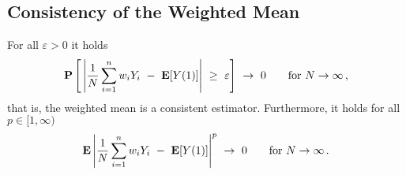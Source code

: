 \subsection*{Consistency of the Weighted Mean}
\begin{theorem}
  \label{bw:ce:th}
  For all
  $\varepsilon>0$ it holds
  \begin{gather*}
    \P
    \left[ 
      \,
  \left| 
    \frac{1}{N}
    \sum_{i=1}^{n} 
    w_i
    Y_i
    \ 
    -
    \ 
    \E[Y(1)]
  \right|
    \ 
    \ge
    \ 
    \varepsilon
    \right]
    \ 
    \to
    \ 
    0
    \qquad
    \text{for}\ 
    N
    \to 
    \infty
    \,,
  \end{gather*}
  that is, the weighted mean is a consistent estimator.
  Furthermore, it holds for all $p\in [1,\infty)$
  \begin{gather*}
    \E
  \left| 
    \frac{1}{N}
    \sum_{i=1}^{n} 
    w_i
    Y_i
    \ 
    -
    \ 
    \E[Y(1)]
  \right|
  ^p
    \ 
    \to
    \ 
    0
    \qquad
    \text{for}\ 
    N
    \to 
    \infty
    \,.
  \end{gather*}
\end{theorem}

